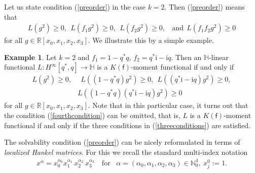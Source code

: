\documentclass[11pt,a4paper]{amsart}
\theoremstyle{definition}
\newtheorem{example}[theorem]{Example}
\begin{document}
Let us state condition (\ref{preorder}) in the case $k=2$. Then (\ref{preorder})
means that
%
\begin{align*}
L(g^{2})\geq 0,~~ L(f_{1}g^{2})\geq 0, ~ ~ L(f_{2}g^{2})\geq 0,~~~~
\text{and}~~ L(f_{1}f_{2}g^{2})\geq 0
\end{align*}
%
for all $g\in \mathbb{R}[x_{0},x_{1},x_{2},x_{3}]$. We illustrate this
by a simple example.
%
\begin{example}
\label{exmp7.2}
Let $k=2$ and $f_{1}=1-q^{*}q$, $f_{2}=q^{*} \mathrm{i}-\mathrm{i}q$. Then
an $\mathbb{H}$-linear functional
$L:H^{\infty}[q^{*}, q]\to \mathbb{H}$ is a $K({\mathsf{f}})$-moment functional
if and only if
%
\begin{align}
\label{threeconditions}
L(g^{2})\geq 0,& ~~ L((1-q^{*}q)g^{2})\geq 0, ~ ~ L((q^{*} \mathrm{i}-
\mathrm{i}q) g^{2})\geq 0,
\\
& L((1-q^{*}q)(q^{*} \mathrm{i}-\mathrm{i}q)g^{2})\geq 0
\label{fourthcondition}
\end{align}
%
for all $g\in \mathbb{R}[x_{0},x_{1},x_{2},x_{3}]$. Note that in this particular
case, it turns out that the condition (\ref{fourthcondition}) can be omitted,
that is, $L$ is a $K({\mathsf{f}})$-moment functional if and only if the three
conditions in (\ref{threeconditions}) are satisfied.
\end{example}

The solvability condition (\ref{preorder}) can be nicely reformulated in
terms of \textit{localized Hankel matrices}. For this we recall the standard
multi-index notation
%
\begin{align*}
x^{\alpha }= x_{0}^{\alpha _{0}} x_{1}^{\alpha _{1}}\, x_{2}^{\alpha _{2}}
\, x_{3}^{\alpha _{3}}\quad \textrm{for}\, ~~~ \alpha =( \alpha _{0},
\alpha _{1},\alpha _{2},\alpha _{3})\in \mathbb{N}_{0}^{4}, ~ x_{j}^{0}:=1.
\end{align*}
\end{document}
